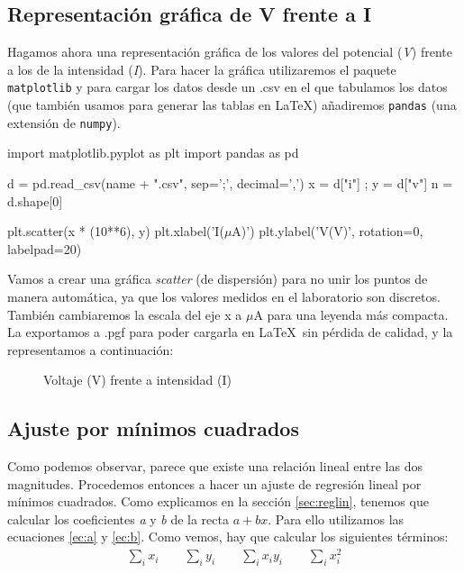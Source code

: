 \documentclass[12pt, a4paper, titlepage]{article}
\newcommand{\code}[1]{\texttt{#1}} %
\begin{document}
  \subsection{Representación gráfica de V frente a I}

  Hagamos ahora una representación gráfica de los valores del potencial (\textit{V}) frente a los de la intensidad (\textit{I}). Para hacer la gráfica utilizaremos el paquete \code{matplotlib} y para cargar los datos desde un .csv en el que tabulamos los datos (que también usamos para generar las tablas en \LaTeX) añadiremos \code{pandas} (una extensión de \code{numpy}).

  \begin{python}
    import matplotlib.pyplot as plt
    import pandas as pd

    d = pd.read_csv(name + ".csv", sep=';', decimal=',')
    x = d["i"] ; y = d["v"]
    n = d.shape[0]

    plt.scatter(x * (10**6), y)
    plt.xlabel('I($\mu$A)')
    plt.ylabel('V(V)', rotation=0, labelpad=20)
  \end{python}

  Vamos a crear una gráfica \textit{scatter} (de dispersión) para no unir los puntos de manera automática, ya que los valores medidos en el laboratorio son discretos. También cambiaremos la escala del eje x a $\mu$A para una leyenda más compacta. La exportamos a .pgf para poder cargarla en \LaTeX\  sin pérdida de calidad, y la representamos a continuación:

  \begin{figure}[H]
    \hspace{2.5em} 
    \caption{Voltaje (V) frente a intensidad (I)}
  \end{figure}

  \subsection{Ajuste por mínimos cuadrados}
  \label{sec:ajusteminres}

  Como podemos observar, parece que existe una relación lineal entre las dos magnitudes. Procedemos entonces a hacer un ajuste de regresión lineal por mínimos cuadrados. Como explicamos en la sección \ref{sec:reglin}, tenemos que calcular los coeficientes \textit{a} y \textit{b} de la recta $a + bx$. Para ello utilizamos las ecuaciones \ref{ec:a} y \ref{ec:b}. Como vemos, hay que calcular los siguientes términos:
  \begin{gather}
    \sum_i x_i \nonumber \qquad \sum_i y_i \nonumber \qquad \sum_i x_iy_i \nonumber \qquad \sum_i x_i^2 \nonumber
  \end{gather}
\end{document}
